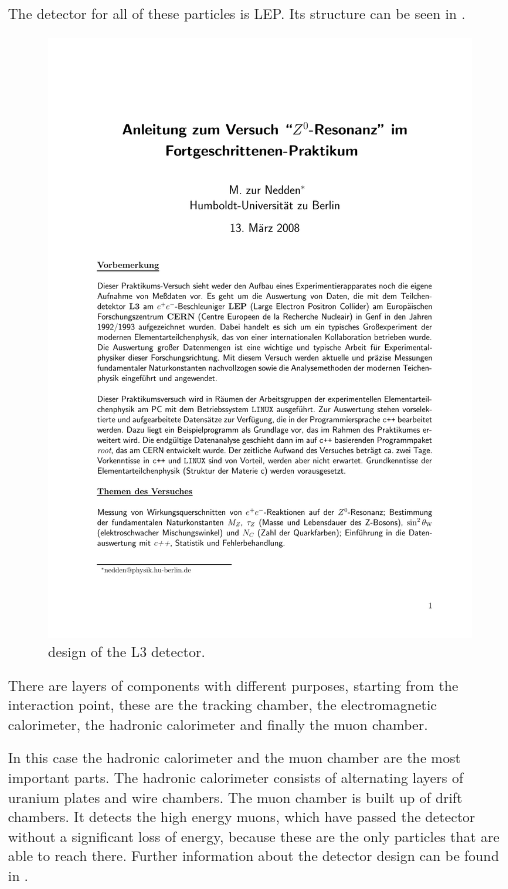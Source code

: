 \documentclass[epj,nopacs]{svjour}
\begin{document}
The detector for all of these particles is LEP. Its structure can be seen
in .
\begin{figure}[htb]
 \centering
 \includegraphics[page=5,viewport=286 620 508 765,clip,%
  width=\columnwidth,keepaspectratio]{../../Z0/docs/Z0ResFprakt}
 \caption{design of the L3 detector.}
 \label{fig:aufbau}
\end{figure}
There are layers of components with different purposes, starting from the
interaction point, these are the tracking chamber, the electromagnetic calorimeter,
the hadronic calorimeter and finally the muon chamber.

In this case the hadronic calorimeter and the muon chamber are the most
important parts. The hadronic calorimeter consists of alternating layers of
uranium plates and wire chambers. The muon chamber is built up of drift
chambers. It detects the high energy muons, which have passed the detector
without a significant loss of energy, because these are the only particles that
are able to reach there. Further information about the detector design can
be found in \cite{script}.
\end{document}
